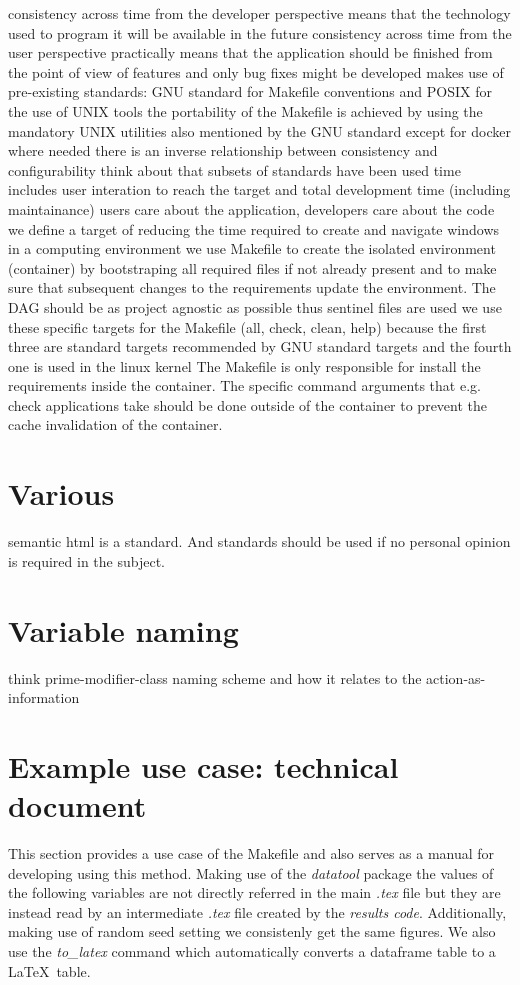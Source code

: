 \documentclass[journal]{IEEEtran}
\begin{document}
consistency across time from the developer perspective means that the technology used to program it will be available in the future
consistency across time from the user perspective practically means that the application should be finished from the point of view of features and only bug fixes might be developed
makes use of pre-existing standards: GNU standard for Makefile conventions and POSIX for the use of UNIX tools
the portability of the Makefile is achieved by using the mandatory UNIX utilities also mentioned by the GNU standard except for docker where needed
there is an inverse relationship between consistency and configurability
think about that subsets of standards have been used
time includes user interation to reach the target and total development time (including maintainance)
users care about the application, developers care about the code
we define a target of reducing the time required to create and navigate windows in a computing environment
we use Makefile to create the isolated environment (container) by bootstraping all required files if not already present and to make sure that subsequent changes to the requirements update the environment. The DAG should be as project agnostic as possible thus sentinel files are used
we use these specific targets for the Makefile (all, check, clean, help) because the first three are standard targets recommended by GNU standard targets and the fourth one is used in the linux kernel
The Makefile is only responsible for install the requirements inside the container.
The specific command arguments that e.g. check applications take should be done outside of the container to prevent the cache invalidation of the container.

\section{Various}
semantic html is a standard. And standards should be used if no personal opinion is required in the subject.

\section{Variable naming}
think prime-modifier-class naming scheme and how it relates to the action-as-information

\section{Example use case: technical document}
This section provides a use case of the Makefile and also serves as a manual for developing using this method.
Making use of the \textit{datatool} package the values of the following variables are not directly referred in the main \textit{.tex} file but they are instead read by an intermediate \textit{.tex} file created by the \textit{results code}.
Additionally, making use of random seed setting we consistenly get the same figures.
We also use the \textit{to\_latex} command which automatically converts a dataframe table to a \LaTeX\ table.
\end{document}
